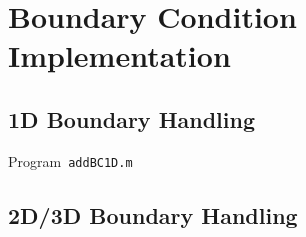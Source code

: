 \section{Boundary Condition Implementation}

\subsection{1D Boundary Handling}

\begin{listing}[ht!]
	\tiny
	\centering
	\caption{Program~\texttt{addBC1D.m}}
	\label{code:addBC1D.m}
\end{listing}

\subsection{2D/3D Boundary Handling}
